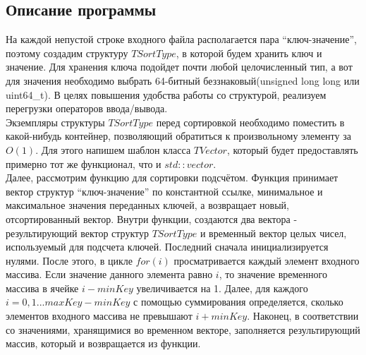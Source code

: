 \subsection{Описание программы}
На каждой непустой строке входного файла располагается пара \enquote{ключ-значение}, поэтому создадим структуру $TSortType$, в которой будем хранить ключ и значение. Для хранения ключа подойдет почти любой целочисленный тип, а вот для значения необходимо выбрать 64-битный 
беззнаковый(unsigned long long или uint64\_t). В целях повышения удобства работы со структурой, реализуем перегрузки операторов ввода/вывода. 
\\Экземпляры структуры $TSortType$ перед сортировкой необходимо поместить в какой-нибудь контейнер, позволяющий обратиться к произвольному элементу за $O(1)$. Для этого напишем шаблон класса 
$TVector$, который будет предоставлять примерно тот же функционал, что и $std::vector$.
\\Далее, рассмотрим функцию для сортировки подсчётом. Функция принимает вектор структур \enquote{ключ-значение} по константной ссылке, минимальное и максимальное значения переданных ключей, а возвращает новый, отсортированный вектор. Внутри функции, создаются два вектора - результирующий вектор структур $TSortType$ и временный вектор целых чисел, используемый для подсчета ключей. Последний сначала инициализируется нулями. После этого, в цикле $for(i)$ просматривается каждый элемент входного массива. Если значение данного элемента равно $i$, то значение временного массива в ячейке $i - minKey$ увеличивается на 1. Далее, для каждого $i = 0,1 . . . maxKey - minKey$ с помощью суммирования определяется, сколько элементов входного массива не превышают $i + minKey$. Наконец, в соответствии со значениями, хранящимися во временном векторе, заполняется результирующий массив, который и возвращается из функции. 

\pagebreak

